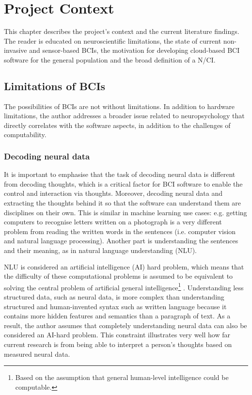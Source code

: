 \chapter{Project Context}
\graphicspath{{Chapter2/Figs/}{Chapter2/Figs/}}

This chapter describes the project's context and the current literature findings. The reader is educated on neuroscientific limitations, the state of current non-invasive and sensor-based BCIs, the motivation for developing cloud-based BCI software for the general population and the broad definition of a N/CI.

\section{Limitations of BCIs}
\label{chapter2-limitations-of-bcis}

The possibilities of BCIs are not without limitations. In addition to hardware limitations, the author addresses a broader issue related to neuropsychology that directly correlates with the software aspects, in addition to the challenges of computability.

\subsection{Decoding neural data}
\label{chapter2-decoding-neural-data}

It is important to emphasise that the task of decoding neural data is different from decoding thoughts, which is a critical factor for BCI software to enable the control and interaction via thoughts. Moreover, decoding neural data and extracting the thoughts behind it so that the software can understand them are disciplines on their own. This is similar in machine learning use cases: e.g. getting computers to recognise letters written on a photograph is a very different problem from reading the written words in the sentences (i.e. computer vision and natural language processing). Another part is understanding the sentences and their meaning, as in natural language understanding (NLU).

NLU is considered an artificial intelligence (AI) hard problem, which means that the difficulty of these computational problems is assumed to be equivalent to solving the central problem of artificial general intelligence\footnote{Based on the assumption that general human-level intelligence could be computable.} \citep{demasi_theoretical_2010}. Understanding less structured data, such as neural data, is more complex than understanding structured and human-invented syntax such as written language because it contains more hidden features and semantics than a paragraph of text. As a result, the author assumes that completely understanding neural data can also be considered an AI-hard problem. This constraint illustrates very well how far current research is from being able to interpret a person's thoughts based on measured neural data.

